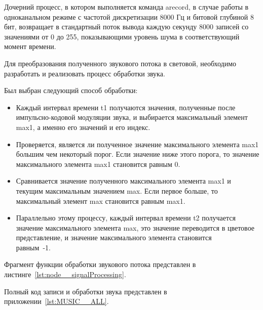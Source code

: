 Дочерний процесс, в котором выполняется команда arecord, в случае работы в одноканальном режиме с частотой дискретизации 8000 Гц и битовой глубиной 8 бит, возвращает в стандартный поток вывода каждую секунду 8000 записей со значениями от 0 до 255, показывающими уровень шума в соответствующий момент времени.

Для преобразования полученного звукового потока в световой, необходимо разработать и реализовать процесс обработки звука.

Был выбран следующий способ обработки:

\begin{itemize}
  \item Каждый интервал времени t1 получаются значения, полученные после импульсно-кодовой модуляции звука, и выбирается максимальный элемент max1, а именно его значений и его индекс.
  \item Проверяется, является ли полученное значение максимального элемента max1 большим чем некоторый порог. Если значение ниже этого порога, то значение максимального элемента max1 становится равным 0.
  \item Сравнивается значение полученного максимального элемента max1 и текущим максимальным значением max. Если первое больше, то максимальный элемент max становится равным max1.
  \item Параллельно этому процессу, каждый интервал времени t2 получается значение максимального элемента max, это значение переводится в цветовое представление, и значение максимального элемента становится\\равным~-1.
\end{itemize}

Фрагмент функции обработки звукового потока представлен в листинге~\ref{lst:node__signalProcessing}.



Полный код записи и обработки звука представлен в приложении~\ref{lst:MUSIC__ALL}.